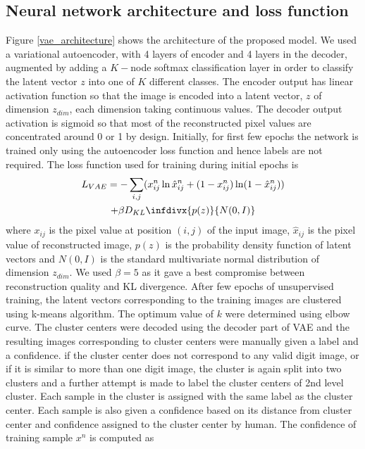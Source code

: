\documentclass[journal]{IEEEtran}
\newcommand{\infdiv}{D_{KL}\infdivx}
\begin{document}
\subsection{Neural network architecture and loss function}
Figure \ref{vae_architecture} shows the architecture of the proposed model. We used a variational autoencoder\cite{vae}, with 4 layers of encoder and 4 layers in the decoder, augmented by adding a $K-$node softmax classification layer in order to classify the latent vector $z$ into one of $K$ different classes.  The encoder output has linear activation function so that the image is encoded into a latent vector, $z$  of dimension $z_{dim}$, each dimension taking continuous values. The decoder output activation is sigmoid so that most of the reconstructed pixel values  are concentrated around 0 or 1 by design. Initially, for first few epochs the network is trained only using the autoencoder loss function and hence labels are not required. The loss function used for training during initial epochs is 
\begin{multline}
L_{VAE} = -\sum_{i, j}(x_{ij}^n \ln \hat{x}_{ij}^n + (1 - x_{ij}^n) \ln(1 -  \hat{x}_{ij}^n ) )  \\
+ \beta \infdiv{p(z)}{N(0,I)}  
\end{multline}
where   $x_{ij}$ is the pixel value at position $(i, j)$ of the input image, $\hat{x}_{ij}$ is the pixel value of reconstructed image, $p(z)$ is the probability density function of latent vectors and $N(0,I)$ is the standard multivariate normal distribution of dimension $z_{dim}$. We used $\beta = 5$ as it gave a best compromise between reconstruction quality and KL divergence.   After few epochs of unsupervised training, the latent vectors corresponding to the training images are clustered using k-means algorithm. The optimum value of $k$ were determined using elbow curve. The cluster centers were decoded using the decoder part of VAE and the resulting images corresponding to cluster centers were manually given a label and a confidence. if the cluster center does not correspond to any valid digit image, or if it is similar to more than one digit image, the cluster is again split into two clusters and a further attempt is made to label the cluster centers of 2nd level cluster.  Each sample in the cluster is assigned with the  same label as the cluster center. Each sample is also given a confidence based on its distance from cluster center and  confidence assigned to the cluster center by human. The confidence of  training sample $x^n$ is computed as
\end{document}
